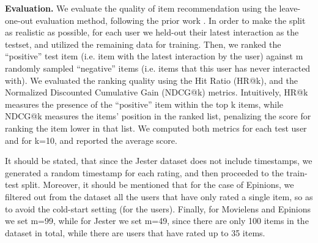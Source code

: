 \textbf{Evaluation.}
We evaluate the quality of item recommendation using the leave-one-out evaluation method, following the prior work \cite{he2017neural,ebesu2018collaborative}.
In order to make the split as realistic as possible, for each user we held-out their latest interaction as the testset, and utilized the remaining data for training.
Then, we ranked the ``positive'' test item (i.e. item with the latest interaction by the user) against m randomly sampled ``negative'' items (i.e. items that this user has never interacted with).
We evaluated the ranking quality using the Hit Ratio (HR@k), and the Normalized Discounted Cumulative Gain (NDCG@k) metrics.
Intuitively, HR@k measures the presence of the ``positive'' item within the top k items, while NDCG@k measures the items' position in the ranked list, penalizing the score for ranking the item lower in that list.
We computed both metrics for each test user and for k=10, and reported the average score.

It should be stated, that since the Jester dataset does not include timestamps, we generated a random timestamp for each rating, and then proceeded to the train-test split. 
Moreover, it should be mentioned that for the case of Epinions, we filtered out from the dataset all the users that have only rated a single item, so as to avoid the cold-start setting (for the users).
Finally, for Movielens and Epinions we set m=99, while for Jester we set m=49, since there are only 100 items in the dataset in total, while there are users that have rated up to 35 items.
